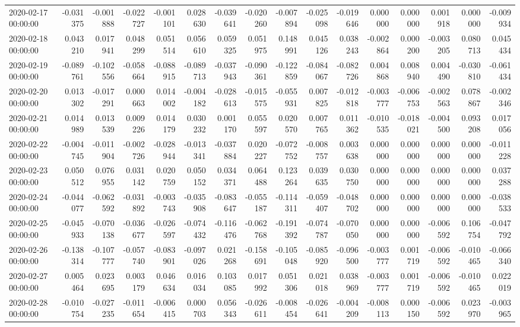 \begin{tabular}{lrrrrrrrrrrrrrrr}
2020-02-17 00:00:00 & -0.031375 & -0.001888 & -0.022727 & -0.001101 & 0.028630 & -0.039641 & -0.020260 & -0.007894 & -0.025098 & -0.019646 & 0.000000 & 0.000000 & 0.001918 & 0.000000 & -0.009934 \\
2020-02-18 00:00:00 & 0.043210 & 0.017941 & 0.048299 & 0.051514 & 0.056610 & 0.059325 & 0.051975 & 0.148991 & 0.045126 & 0.038243 & -0.002864 & 0.000200 & -0.003205 & 0.080713 & 0.045434 \\
2020-02-19 00:00:00 & -0.089761 & -0.102556 & -0.058664 & -0.088915 & -0.089713 & -0.037943 & -0.090361 & -0.122859 & -0.084067 & -0.082726 & 0.004868 & 0.008940 & 0.004490 & -0.030810 & -0.061434 \\
2020-02-20 00:00:00 & 0.013302 & -0.017291 & 0.000663 & 0.014002 & -0.004182 & -0.028613 & -0.015575 & -0.055931 & 0.007825 & -0.012818 & -0.003777 & -0.006753 & -0.002563 & 0.078867 & -0.002346 \\
2020-02-21 00:00:00 & 0.014989 & 0.013539 & 0.009226 & 0.014179 & 0.030232 & 0.001170 & 0.055597 & 0.020570 & 0.007765 & 0.011362 & -0.010535 & -0.018021 & -0.004500 & 0.093208 & 0.017056 \\
2020-02-22 00:00:00 & -0.004745 & -0.011904 & -0.002726 & -0.028944 & -0.013341 & -0.037884 & 0.020227 & -0.072752 & -0.008757 & 0.003638 & 0.000000 & 0.000000 & 0.000000 & 0.000000 & -0.011228 \\
2020-02-23 00:00:00 & 0.050512 & 0.076955 & 0.031142 & 0.020759 & 0.050152 & 0.034371 & 0.064488 & 0.123264 & 0.039635 & 0.030750 & 0.000000 & 0.000000 & 0.000000 & 0.000000 & 0.037288 \\
2020-02-24 00:00:00 & -0.044077 & -0.062592 & -0.031892 & -0.003743 & -0.035908 & -0.083647 & -0.055187 & -0.114311 & -0.059407 & -0.048702 & 0.000000 & 0.000000 & 0.000000 & 0.000000 & -0.038533 \\
2020-02-25 00:00:00 & -0.045933 & -0.070138 & -0.036677 & -0.026597 & -0.074432 & -0.116476 & -0.062768 & -0.191392 & -0.074787 & -0.070050 & 0.000000 & 0.000000 & -0.006592 & 0.106754 & -0.047792 \\
2020-02-26 00:00:00 & -0.138314 & -0.107777 & -0.057740 & -0.083901 & -0.097026 & 0.021268 & -0.158691 & -0.105048 & -0.085920 & -0.096500 & -0.003777 & 0.001719 & -0.006592 & -0.010465 & -0.066340 \\
2020-02-27 00:00:00 & 0.005464 & 0.023695 & 0.003179 & 0.046634 & 0.016034 & 0.103085 & 0.017992 & 0.051306 & 0.021018 & 0.038969 & -0.003777 & 0.001719 & -0.006592 & -0.010465 & 0.022019 \\
2020-02-28 00:00:00 & -0.010754 & -0.027235 & -0.011654 & -0.006415 & 0.000703 & 0.056343 & -0.026611 & -0.008454 & -0.026641 & -0.004209 & -0.008113 & 0.000150 & -0.006592 & 0.023970 & -0.003965 \\

\end{tabular}
